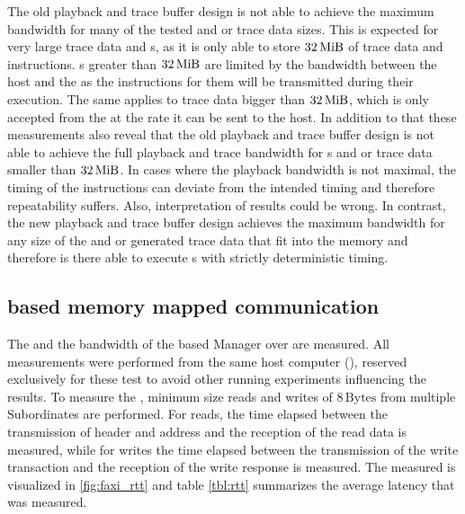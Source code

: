 The old playback and trace buffer design is not able to achieve the maximum bandwidth for many of the tested \PlaybackProgram{} and or trace data sizes. This is expected for very large trace data and \PlaybackProgram{}s, as it is only able to store $\SI{32}{\mebi\byte}$ of trace data and \PlaybackProgram{} instructions. \PlaybackProgram{}s greater than $\SI{32}{\mebi\byte}$ are limited by the bandwidth between the host and the \FPGA{} as the instructions for them will be transmitted during their execution. The same applies to trace data bigger than $\SI{32}{\mebi\byte}$, which is only accepted from the \pbexec{} at the rate it can be sent to the host.
In addition to that these measurements also reveal that the old playback and trace buffer design is not able to achieve the full playback and trace bandwidth for \PlaybackProgram{}s and or trace data smaller than $\SI{32}{\mebi\byte}$. In cases where the playback bandwidth is not maximal, the timing of the instructions can deviate from the intended timing and therefore repeatability suffers. Also, interpretation of results could be wrong. In contrast, the new playback and trace buffer design achieves the maximum bandwidth for any size of the \PlaybackProgram{} and or generated trace data that fit into the memory and therefore is there able to execute \PlaybackProgram{}s with strictly deterministic timing.



\subsection{\FAXI{} based memory mapped communication}
The \rtt{} and the bandwidth of the \FAXI{} based \AXI{} Manager over \HostARQ{} are measured. All measurements were performed from the same host computer (\testnode{}), reserved exclusively for these test to avoid other running experiments influencing the results.
To measure the \rtt{}, minimum size reads and writes of $\num{8}\,\text{Bytes}$ from multiple \AXI{} Subordinates are performed. For reads, the time elapsed between the transmission of header and address and the reception of the read data is measured, while for writes the time elapsed between the transmission of the write transaction and the reception of the write response is measured. The measured \rtt{} is visualized in \autoref{fig:faxi_rtt} and table \autoref{tbl:rtt} summarizes the average latency that was measured.

